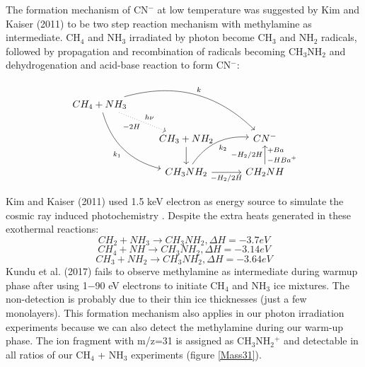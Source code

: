 The formation mechanism of CN$^-$ at low temperature was suggested by Kim and Kaiser (2011) to be two step reaction mechanism with methylamine as intermediate\cite{kim}. CH$_4$ and NH$_3$ irradiated by photon become CH$_3$ and NH$_2$ radicals, followed by propagation and recombination of radicals becoming CH$_3$NH$_2$ and dehydrogenation and acid-base reaction to form CN$^-$:

\begin{equation}
\begin{tikzcd}
CH_4+NH_3
\arrow[drr, bend left, "k"]
\arrow[ddr, bend right, "k_1"']
\arrow[dr, dotted, "{h\nu}", "-2H"'] & & \\
& CH_3+NH_2 \arrow [d]
& CN^-\\
& CH_3NH_2 \arrow[ r, "-H_2/2H"'] \arrow[ur, bend left, "k_2"']
& CH_2NH \arrow[u, "-H_2/2H", "+Ba"' near end, "-HBa^+"' near start]
\end{tikzcd}
\label{fig:CNmechanism}
\end{equation}

Kim and Kaiser (2011) used 1.5 keV electron as energy source to simulate the cosmic ray induced photochemistry \cite{kim}. Despite the extra heats generated in these exothermal reactions:
\begin{equation}
CH_2 + NH_3 \rightarrow CH_3NH_2, \Delta H = -3.7 eV
\label{eq:methylamine_1}
\end{equation}
\begin{equation}
CH_4 + NH \rightarrow CH_3NH_2, \Delta H = -3.14 eV
\label{eq:methylamine_2}
\end{equation}
\begin{equation}
CH_3 + NH_2 \rightarrow CH_3NH_2, \Delta H = -3.64 eV
\label{eq:methylamine_3}
\end{equation}
Kundu et al. (2017) fails to observe methylamine as intermediate during warmup phase after using 1$-$90 eV electrons to initiate CH$_4$ and NH$_3$ ice mixtures\cite{kundu2017electron}. The non-detection is probably due to their thin ice thicknesses (just a few monolayers). This formation mechanism also applies in our photon irradiation experiments because we can also detect the methylamine during our warm-up phase. The ion fragment with m/z=31 is assigned as CH$_3$NH$_2$$^+$ and detectable in all ratios of our CH$_4$ + NH$_3$ experiments (figure \ref{Mass31}).\\

